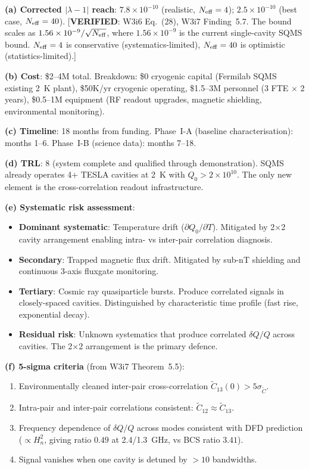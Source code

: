 \documentclass[11pt]{article}
\newcommand{\lam}{\lambda}
\newcommand{\ee}[1]{\times 10^{#1}}
\newcommand{\Heff}{H_n}
\newcommand{\lbone}{|\lam - 1|}
\theoremstyle{definition}
\theoremstyle{remark}
\begin{document}
\begin{tcolorbox}[colback=green!5!white, colframe=green!60!black,
  title=\textbf{RANK \#1: SQMS 4-CAVITY PHASE~I}]

\textbf{(a) Corrected $\lbone$ reach}: $7.8\ee{-10}$
(realistic, $N_{\rm eff} = 4$); $2.5\ee{-10}$ (best case,
$N_{\rm eff} = 40$). [\textbf{VERIFIED}: W3i6 Eq.~(28),
W3i7 Finding~5.7. The bound scales as $1.56\ee{-9}/\sqrt{N_{\rm eff}}$,
where $1.56\ee{-9}$ is the current single-cavity SQMS bound.
$N_{\rm eff} = 4$ is conservative (systematics-limited), $N_{\rm eff} = 40$
is optimistic (statistics-limited).]

\textbf{(b) Cost}: \$2--4M total. Breakdown: \$0 cryogenic capital
(Fermilab SQMS existing 2~K plant), \$50K/yr cryogenic operating,
\$1.5--3M personnel (3 FTE $\times$ 2 years), \$0.5--1M equipment
(RF readout upgrades, magnetic shielding, environmental monitoring).

\textbf{(c) Timeline}: 18 months from funding. Phase~I-A (baseline
characterisation): months 1--6. Phase~I-B (science data): months 7--18.

\textbf{(d) TRL}: 8 (system complete and qualified through demonstration).
SQMS already operates 4+ TESLA cavities at 2~K with $Q_0 > 2\ee{10}$.
The only new element is the cross-correlation readout infrastructure.

\textbf{(e) Systematic risk assessment}:
\begin{itemize}[nosep]
\item \textbf{Dominant systematic}: Temperature drift
  ($\partial Q_0/\partial T$). Mitigated by 2$\times$2 cavity
  arrangement enabling intra- vs inter-pair correlation diagnosis.
\item \textbf{Secondary}: Trapped magnetic flux drift. Mitigated by
  sub-nT shielding and continuous 3-axis fluxgate monitoring.
\item \textbf{Tertiary}: Cosmic ray quasiparticle bursts. Produce
  correlated signals in closely-spaced cavities. Distinguished by
  characteristic time profile (fast rise, exponential decay).
\item \textbf{Residual risk}: Unknown systematics that produce
  correlated $\delta Q/Q$ across cavities. The 2$\times$2
  arrangement is the primary defence.
\end{itemize}

\textbf{(f) 5-sigma criteria} (from W3i7 Theorem~5.5):
\begin{enumerate}[nosep]
\item Environmentally cleaned inter-pair cross-correlation
  $\tilde{C}_{13}(0) > 5\sigma_{\tilde{C}}$.
\item Intra-pair and inter-pair correlations consistent:
  $\tilde{C}_{12} \approx \tilde{C}_{13}$.
\item Frequency dependence of $\delta Q/Q$ across modes consistent
  with DFD prediction ($\propto \Heff^2$, giving ratio $0.49$ at
  2.4/1.3~GHz, vs BCS ratio $3.41$).
\item Signal vanishes when one cavity is detuned by $>10$ bandwidths.
\end{enumerate}

\end{tcolorbox}
\end{document}
